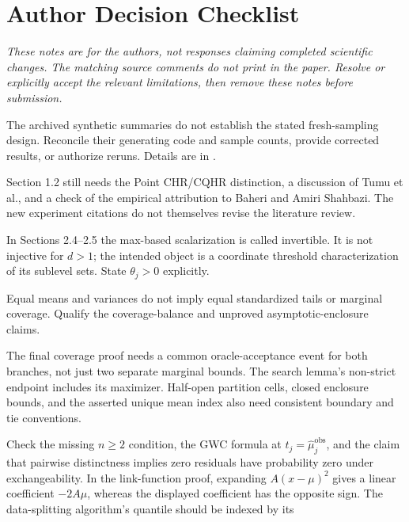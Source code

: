\documentclass[11pt]{article}
\begin{document}
\clearpage
\section*{Author Decision Checklist}
\textit{These notes are for the authors, not responses claiming completed
scientific changes. The matching source comments do not print in the paper.
Resolve or explicitly accept the relevant limitations, then remove these
notes before submission.}

\begin{description}[style=nextline,leftmargin=0pt,font=\normalfont\bfseries]
\item[AUTHOR-CHECK DATA]
The archived synthetic summaries do not establish the stated fresh-sampling
design. Reconcile their generating code and sample counts, provide corrected
results, or authorize reruns. Details are in .
\item[AUTHOR-CHECK LIT]
Section 1.2 still needs the Point CHR/CQHR distinction, a discussion of
Tumu et al., and a check of the empirical attribution to Baheri and Amiri
Shahbazi. The new experiment citations do not themselves revise the literature review.
\item[AUTHOR-CHECK MAP]
In Sections 2.4--2.5 the max-based scalarization is called invertible.
It is not injective for $d>1$; the intended object is a coordinate threshold
characterization of its sublevel sets. State $\theta_j>0$ explicitly.
\item[AUTHOR-CHECK BALANCE]
Equal means and variances do not imply equal standardized tails or marginal
coverage. Qualify the coverage-balance and unproved asymptotic-enclosure claims.
\item[AUTHOR-CHECK EVENT / ENDPOINT / BOUNDARY]
The final coverage proof needs a common oracle-acceptance event for both
branches, not just two separate marginal bounds. The search lemma's
non-strict endpoint includes its maximizer. Half-open
partition cells, closed enclosure bounds, and the asserted unique mean
index also need consistent boundary and tie conventions.
\item[AUTHOR-CHECK DOMAIN / ZERO / ALGEBRA / DS]
Check the missing $n\geq2$ condition, the GWC formula at
$t_j=\hat\mu_j^{\mathrm{obs}}$, and the claim that pairwise distinctness
implies zero residuals have probability zero under exchangeability.
In the link-function proof, expanding $A(x-\mu)^2$ gives a linear
coefficient $-2A\mu$, whereas the displayed coefficient has the opposite
sign. The data-splitting algorithm's quantile should be indexed by its

\end{description}
\end{document}
